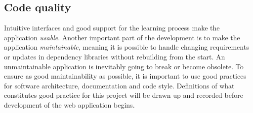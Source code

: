 \subsection{Code quality}

Intuitive interfaces and good support for the learning process make the application \emph{usable}. Another important part of the development is to make the application \emph{maintainable}, meaning it is possible to handle changing requirements or updates in dependency libraries without rebuilding from the start. An unmaintainable application is inevitably going to break or become obsolete. To ensure as good maintainability as possible, it is important to use good practices for software architecture, documentation and code style. Definitions of what constitutes good practice for this project will be drawn up and recorded before development of the web application begins.
